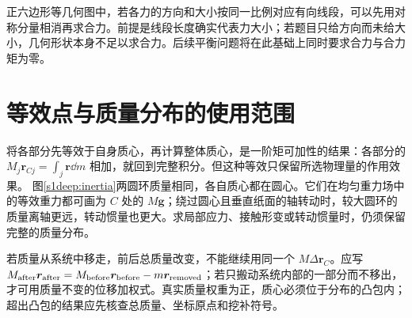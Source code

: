 正六边形等几何图中，若各力的方向和大小按同一比例对应有向线段，可以先用对称分量相消再求合力。前提是线段长度确实代表力大小；若题目只给方向而未给大小，几何形状本身不足以求合力。后续平衡问题将在此基础上同时要求合力与合力矩为零。



\section{等效点与质量分布的使用范围}
将各部分先等效于自身质心，再计算整体质心，是一阶矩可加性的结果：各部分的 $M_j\bm r_{Cj}=\int_j\bm r\dd m$ 相加，就回到完整积分。但这种等效只保留所选物理量的作用效果。
图\ref{s1deep:inertia}两圆环质量相同，各自质心都在圆心。它们在均匀重力场中的等效重力都可画为 $C$ 处的 $M\bm g$；绕过圆心且垂直纸面的轴转动时，较大圆环的质量离轴更远，转动惯量也更大。求局部应力、接触形变或转动惯量时，仍须保留完整的质量分布。

若质量从系统中移走，前后总质量改变，不能继续用同一个 $M\Delta\bm r_C$。应写 $M_{\rm after}\bm r_{\rm after}=M_{\rm before}\bm r_{\rm before}-m\bm r_{\rm removed}$；若只搬动系统内部的一部分而不移出，才可用质量不变的位移加权式。真实质量权重为正，质心必须位于分布的凸包内；超出凸包的结果应先核查总质量、坐标原点和挖补符号。
